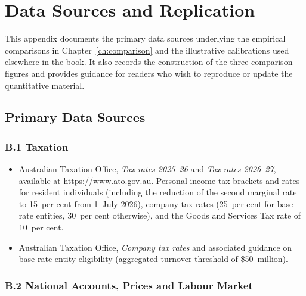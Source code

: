 \documentclass[12pt,anyside]{book}
\theoremstyle{definition}
\theoremstyle{plain}
\theoremstyle{remark}
\begin{document}
\chapter{Data Sources and Replication}
\label{app:data}

This appendix documents the primary data sources underlying the empirical comparisons in Chapter~\ref{ch:comparison} and the illustrative calibrations used elsewhere in the book. It also records the construction of the three comparison figures and provides guidance for readers who wish to reproduce or update the quantitative material.

\section{Primary Data Sources}

\subsection*{B.1 Taxation}

\begin{itemize}
\item Australian Taxation Office, \textit{Tax rates 2025--26} and \textit{Tax rates 2026--27}, available at \url{https://www.ato.gov.au}.  
  Personal income-tax brackets and rates for resident individuals (including the reduction of the second marginal rate to 15~per cent from 1~July 2026), company tax rates (25~per cent for base-rate entities, 30~per cent otherwise), and the Goods and Services Tax rate of 10~per cent.

\item Australian Taxation Office, \textit{Company tax rates} and associated guidance on base-rate entity eligibility (aggregated turnover threshold of \$50~million).
\end{itemize}

\subsection*{B.2 National Accounts, Prices and Labour Market}
\end{document}
